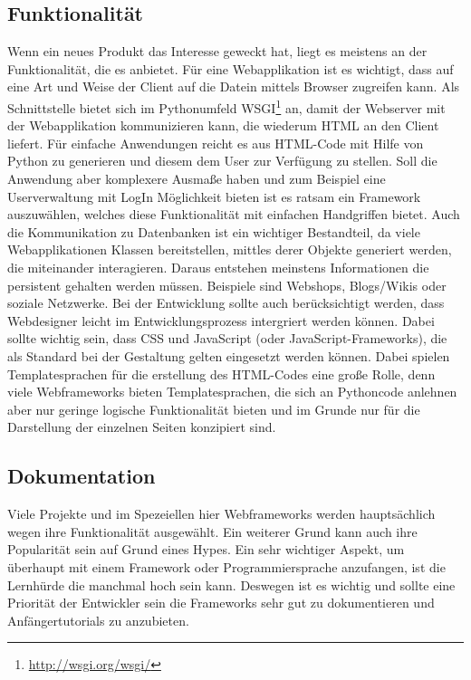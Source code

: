 \subsection{Funktionalität}
Wenn ein neues Produkt das Interesse geweckt hat, liegt es meistens an der
Funktionalität, die es anbietet. Für eine Webapplikation ist es wichtigt, dass
auf eine Art und Weise der Client auf die Datein mittels Browser zugreifen
kann. Als Schnittstelle bietet sich im Pythonumfeld
WSGI\footnote{\url{http://wsgi.org/wsgi/}} an, damit der Webserver mit der
Webapplikation kommunizieren kann, die wiederum HTML an den Client liefert. Für
einfache Anwendungen reicht es aus HTML-Code mit Hilfe von Python zu generieren
und diesem dem User zur Verfügung zu stellen. Soll die Anwendung aber
komplexere Ausmaße haben und zum Beispiel eine Userverwaltung mit LogIn
Möglichkeit bieten ist es ratsam ein Framework auszuwählen, welches diese
Funktionalität mit einfachen Handgriffen bietet. Auch die Kommunikation zu
Datenbanken ist ein wichtiger Bestandteil, da viele Webapplikationen Klassen
bereitstellen, mittles derer Objekte generiert werden, die miteinander
interagieren. Daraus entstehen meinstens Informationen die persistent gehalten
werden müssen. Beispiele sind Webshops, Blogs/Wikis oder soziale Netzwerke. Bei
der Entwicklung sollte auch berücksichtigt werden, dass Webdesigner leicht im
Entwicklungsprozess intergriert werden können. Dabei sollte wichtig sein, dass
CSS und JavaScript (oder JavaScript-Frameworks), die als Standard bei der
Gestaltung gelten eingesetzt werden können. Dabei spielen Templatesprachen für
die erstellung des HTML-Codes eine große Rolle, denn viele Webframeworks bieten
Templatesprachen, die sich an Pythoncode anlehnen aber nur geringe logische
Funktionalität bieten und im Grunde nur für die Darstellung der einzelnen
Seiten konzipiert sind.

\subsection{Dokumentation}
Viele Projekte und im Spezeiellen hier Webframeworks werden hauptsächlich wegen
ihre Funktionalität ausgewählt. Ein weiterer Grund kann auch ihre Popularität
sein auf Grund eines Hypes. Ein sehr wichtiger Aspekt, um überhaupt mit einem
Framework oder Programmiersprache anzufangen, ist die Lernhürde die manchmal
hoch sein kann. Deswegen ist es wichtig und sollte eine Priorität der
Entwickler sein die Frameworks sehr gut zu dokumentieren und Anfängertutorials
zu anzubieten. 

